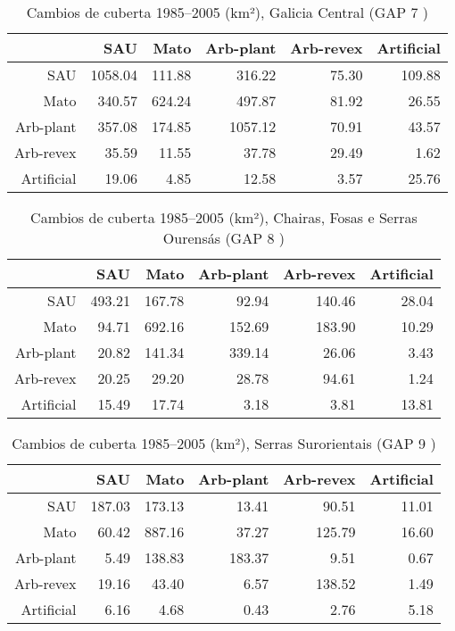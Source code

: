 \begin{table}[p]
\centering
\caption{Cambios de cuberta 1985--2005 (km²), Galicia Central (GAP 7 )} 
\label{TaboaContinxGAP7}
\begin{tabular}{rrrrrr}
  \hline
 & SAU & Mato & Arb-plant & Arb-revex & Artificial \\ 
  \hline
SAU & 1058.04 & 111.88 & 316.22 & 75.30 & 109.88 \\ 
  Mato & 340.57 & 624.24 & 497.87 & 81.92 & 26.55 \\ 
  Arb-plant & 357.08 & 174.85 & 1057.12 & 70.91 & 43.57 \\ 
  Arb-revex & 35.59 & 11.55 & 37.78 & 29.49 & 1.62 \\ 
  Artificial & 19.06 & 4.85 & 12.58 & 3.57 & 25.76 \\ 
   \hline
\end{tabular}
\end{table}
\begin{table}[p]
\centering
\caption{Cambios de cuberta 1985--2005 (km²), Chairas, Fosas e Serras Ourensás (GAP 8 )} 
\label{TaboaContinxGAP8}
\begin{tabular}{rrrrrr}
  \hline
 & SAU & Mato & Arb-plant & Arb-revex & Artificial \\ 
  \hline
SAU & 493.21 & 167.78 & 92.94 & 140.46 & 28.04 \\ 
  Mato & 94.71 & 692.16 & 152.69 & 183.90 & 10.29 \\ 
  Arb-plant & 20.82 & 141.34 & 339.14 & 26.06 & 3.43 \\ 
  Arb-revex & 20.25 & 29.20 & 28.78 & 94.61 & 1.24 \\ 
  Artificial & 15.49 & 17.74 & 3.18 & 3.81 & 13.81 \\ 
   \hline
\end{tabular}
\end{table}
\begin{table}[p]
\centering
\caption{Cambios de cuberta 1985--2005 (km²), Serras Surorientais (GAP 9 )} 
\label{TaboaContinxGAP9}
\begin{tabular}{rrrrrr}
  \hline
 & SAU & Mato & Arb-plant & Arb-revex & Artificial \\ 
  \hline
SAU & 187.03 & 173.13 & 13.41 & 90.51 & 11.01 \\ 
  Mato & 60.42 & 887.16 & 37.27 & 125.79 & 16.60 \\ 
  Arb-plant & 5.49 & 138.83 & 183.37 & 9.51 & 0.67 \\ 
  Arb-revex & 19.16 & 43.40 & 6.57 & 138.52 & 1.49 \\ 
  Artificial & 6.16 & 4.68 & 0.43 & 2.76 & 5.18 \\ 
   \hline
\end{tabular}
\end{table}
